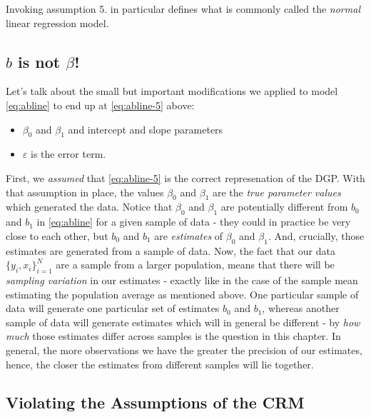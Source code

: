 \documentclass[]{book}
\providecommand{\tightlist}{%
  \setlength{\itemsep}{0pt}\setlength{\parskip}{0pt}}
\begin{document}
Invoking assumption 5. in particular defines what is commonly called the \emph{normal} linear regression model.

\hypertarget{b-is-not-beta}{%
\subsection{\texorpdfstring{\(b\) is not \(\beta\)!}{b is not \textbackslash{}beta!}}\label{b-is-not-beta}}

Let's talk about the small but important modifications we applied to model \eqref{eq:abline} to end up at \eqref{eq:abline-5} above:

\begin{itemize}
\tightlist
\item
  \(\beta_0\) and \(\beta_1\) and intercept and slope parameters
\item
  \(\varepsilon\) is the error term.
\end{itemize}

First, we \emph{assumed} that \eqref{eq:abline-5} is the correct represenation of the DGP. With that assumption in place, the values \(\beta_0\) and \(\beta_1\) are the \emph{true parameter values} which generated the data. Notice that \(\beta_0\) and \(\beta_1\) are potentially different from \(b_0\) and \(b_1\) in \eqref{eq:abline} for a given sample of data - they could in practice be very close to each other, but \(b_0\) and \(b_1\) are \emph{estimates} of \(\beta_0\) and \(\beta_1\). And, crucially, those estimates are generated from a sample of data. Now, the fact that our data \(\{y_i,x_i\}_{i=1}^N\) are a sample from a larger population, means that there will be \emph{sampling variation} in our estimates - exactly like in the case of the sample mean estimating the population average as mentioned above. One particular sample of data will generate one particular set of estimates \(b_0\) and \(b_1\), whereas another sample of data will generate estimates which will in general be different - by \emph{how much} those estimates differ across samples is the question in this chapter. In general, the more observations we have the greater the precision of our estimates, hence, the closer the estimates from different samples will lie together.

\hypertarget{violating-the-assumptions-of-the-crm}{%
\subsection{Violating the Assumptions of the CRM}\label{violating-the-assumptions-of-the-crm}}
\end{document}
